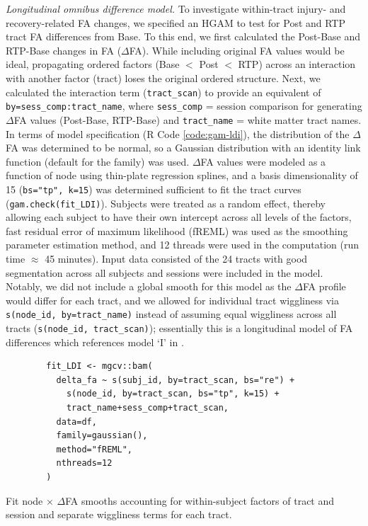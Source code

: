 \documentclass[12pt]{article}
\begin{document}
\textit{Longitudinal omnibus difference model.} To investigate within-tract injury- and recovery-related FA changes, we specified an HGAM to test for Post and RTP tract FA differences from Base. To this end, we first calculated the Post-Base and RTP-Base changes in FA ($\Delta$FA). While including original FA values would be ideal, propagating ordered factors (Base $<$ Post $<$ RTP) across an interaction with another factor (tract) loses the original ordered structure. Next, we calculated the interaction term (\lstinline{tract_scan}) to provide an equivalent of \lstinline{by=sess_comp:tract_name}, where \lstinline{sess_comp} = session comparison for generating $\Delta$FA values (Post-Base, RTP-Base) and \lstinline{tract_name} = white matter tract names. In terms of model specification (R Code \ref{code:gam-ldi}), the distribution of the $\Delta$FA was determined to be normal, so a Gaussian distribution with an identity link function (default for the family) was used. $\Delta$FA values were modeled as a function of node using thin-plate regression splines, and a basis dimensionality of 15 (\lstinline{bs="tp", k=15}) was determined sufficient to fit the tract curves (\lstinline{gam.check(fit_LDI)}). Subjects were treated as a random effect, thereby allowing each subject to have their own intercept across all levels of the factors, fast residual error of maximum likelihood (fREML) was used as the smoothing parameter estimation method, and 12 threads were used in the computation (run time $\approx$ 45 minutes). Input data consisted of the 24 tracts with good segmentation across all subjects and sessions were included in the model. Notably, we did not include a global smooth for this model as the $\Delta$FA profile would differ for each tract, and we allowed for individual tract wiggliness via \lstinline{s(node_id, by=tract_name)} instead of assuming equal wiggliness across all tracts (\lstinline{s(node_id, tract_scan)}); essentially this is a longitudinal model of FA differences which references model `I' in \textcite{pedersen2019HierarchicalGeneralizedAdditive}.

\begin{equ}[H]
	\begin{lstlisting}
		fit_LDI <- mgcv::bam(
		  delta_fa ~ s(subj_id, by=tract_scan, bs="re") +
		    s(node_id, by=tract_scan, bs="tp", k=15) +
		    tract_name+sess_comp+tract_scan,
		  data=df,
		  family=gaussian(),
		  method="fREML",
		  nthreads=12
		)
	\end{lstlisting}
	\caption{Fit node $\times$ $\Delta$FA smooths accounting for within-subject factors of tract and session and separate wiggliness terms for each tract.}
	\label{code:gam-ldi}
\end{equ}
\end{document}
